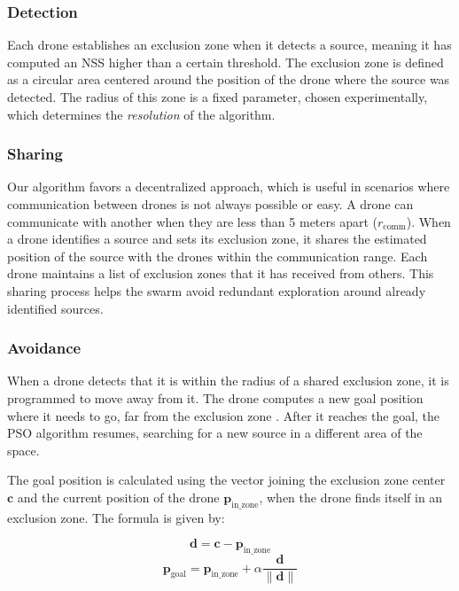 \subsubsection{Detection}
Each drone establishes an exclusion zone when it detects a 
source, meaning it has computed an NSS higher than a certain 
threshold. The exclusion zone is defined as a circular area 
centered around the position of the drone where the source 
was detected. The radius of this zone is a fixed parameter, 
chosen experimentally, which determines the \textit{resolution} 
of the algorithm.

\subsubsection{Sharing}
Our algorithm favors a decentralized approach, which is useful 
in scenarios where communication between drones is not always 
possible or easy. A drone can communicate with another when 
they are less than 5 meters apart (\(r_{\text{comm}}\)).
When a drone identifies a source 
and sets its exclusion zone, it shares the estimated position 
of the source with the drones within the communication range. 
Each drone maintains a list of exclusion zones that it has 
received from others. This sharing process helps the swarm 
avoid redundant exploration around already identified sources.

\subsubsection{Avoidance}
When a drone detects that it is within the radius of a shared 
exclusion zone, it is programmed to move away from it. 
The drone computes a new goal position where it needs to go, far from the 
exclusion zone . After it reaches the goal, 
the PSO algorithm resumes, searching for a new source 
in a different area of the space.

The goal position is calculated using the vector joining 
the exclusion zone center \(\mathbf{c}\) and the current 
position of the drone \(\mathbf{p}_{\text{in\_zone}}\), when the drone finds itself 
in an exclusion zone. The formula is given by:

\[
\mathbf{d} = \mathbf{c} - \mathbf{p}_{\text{in\_zone}}
\]
\[
\mathbf{p}_{\text{goal}} = \mathbf{p}_{\text{in\_zone}} + \alpha \frac{\mathbf{d}}{\|\mathbf{d}\|}
\] \label{eq:move_away}

